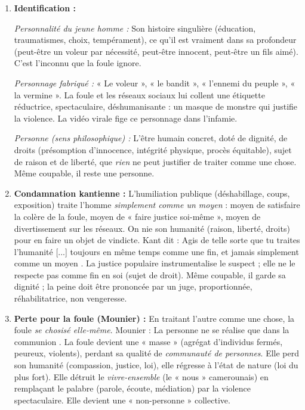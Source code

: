 \documentclass[11pt]{article}
\begin{document}
\begin{corrige}
\begin{enumerate}
\item \textbf{Identification :}
\par \textit{Personnalité du jeune homme :} Son histoire singulière (éducation, traumatismes, choix, tempérament), ce qu'il est vraiment dans sa profondeur (peut-être un voleur par nécessité, peut-être innocent, peut-être un fils aimé). C'est l'inconnu que la foule ignore.
\par \textit{Personnage fabriqué :} « Le voleur », « le bandit », « l'ennemi du peuple », « la vermine ». La foule et les réseaux sociaux lui collent une étiquette réductrice, spectaculaire, déshumanisante : un masque de monstre qui justifie la violence. La vidéo virale fige ce personnage dans l'infamie.
\par \textit{Personne (sens philosophique) :} L'être humain concret, doté de dignité, de droits (présomption d'innocence, intégrité physique, procès équitable), sujet de raison et de liberté, que \emph{rien} ne peut justifier de traiter comme une chose. Même coupable, il reste une personne.
\item \textbf{Condamnation kantienne :} L'humiliation publique (déshabillage, coups, exposition) traite l'homme \emph{simplement comme un moyen} : moyen de satisfaire la colère de la foule, moyen de « faire justice soi-même », moyen de divertissement sur les réseaux. On nie son humanité (raison, liberté, droits) pour en faire un objet de vindicte. Kant dit : \guillemotleft Agis de telle sorte que tu traites l'humanité [...] toujours en même temps comme une fin, et jamais simplement comme un moyen \guillemotright. La justice populaire instrumentalise le suspect ; elle ne le respecte pas comme fin en soi (sujet de droit). Même coupable, il garde sa dignité ; la peine doit être prononcée par un juge, proportionnée, réhabilitatrice, non vengeresse.
\item \textbf{Perte pour la foule (Mounier) :} En traitant l'autre comme une chose, la foule \emph{se chosisé elle-même}. Mounier : \guillemotleft La personne ne se réalise que dans la communion \guillemotright. La foule devient une « masse » (agrégat d'individus fermés, peureux, violents), perdant sa qualité de \emph{communauté de personnes}. Elle perd son humanité (compassion, justice, loi), elle régresse à l'état de nature (loi du plus fort). Elle détruit le \emph{vivre-ensemble} (le « nous » camerounais) en remplaçant le palabre (parole, écoute, médiation) par la violence spectaculaire. Elle devient une « non-personne » collective.

\end{enumerate}
\end{corrige}
\end{document}
